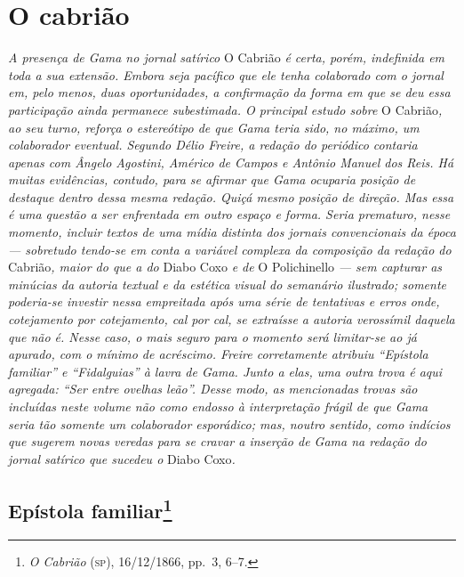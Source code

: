 
\part{O cabrião} %

\begin{argumento}
\emph{A presença de Gama no jornal satírico} O Cabrião \emph{é certa,
porém, indefinida em toda a sua extensão. Embora seja pacífico que ele
tenha colaborado com o jornal em, pelo menos, duas oportunidades, a
confirmação da forma em que se deu essa participação ainda permanece
subestimada. O principal estudo sobre} O Cabrião\emph{, ao seu turno,
reforça o estereótipo de que Gama teria sido, no máximo, um colaborador
eventual. Segundo Délio Freire, a redação do periódico contaria apenas
com Ângelo Agostini, Américo de Campos e Antônio Manuel dos Reis. Há
muitas evidências, contudo, para se afirmar que Gama ocuparia posição de
destaque dentro dessa mesma redação. Quiçá mesmo posição de direção. Mas
essa é uma questão a ser enfrentada em outro espaço e forma. Seria
prematuro, nesse momento, incluir textos de uma mídia distinta dos
jornais convencionais da época --- sobretudo tendo-se em conta a variável
complexa da composição da redação do} Cabrião\emph{, maior do que a do}
Diabo Coxo \emph{e de} O Polichinello \emph{--- sem capturar as minúcias
da autoria textual e da estética visual do semanário ilustrado; somente
poderia-se investir nessa empreitada após uma série de tentativas e
erros onde, cotejamento por cotejamento, cal por cal, se extraísse a
autoria verossímil daquela que não é. Nesse caso, o mais seguro para o
momento será limitar-se ao já apurado, com o mínimo de acréscimo. Freire
corretamente atribuiu ``Epístola familiar'' e ``Fidalguias'' à lavra de Gama.
Junto a elas, uma outra trova é aqui agregada: ``Ser entre ovelhas leão''.
Desse modo, as mencionadas trovas são incluídas neste volume não como
endosso à interpretação frágil de que Gama seria tão somente um
colaborador esporádico; mas, noutro sentido, como indícios que sugerem
novas veredas para se cravar a inserção de Gama na redação do jornal
satírico que sucedeu o} Diabo Coxo\emph{.}
\end{argumento}

\chapter{Epístola familiar\footnote{\emph{O Cabrião} (\textsc{sp}), 16/12/1866, pp.~3, 6--7.}} %

